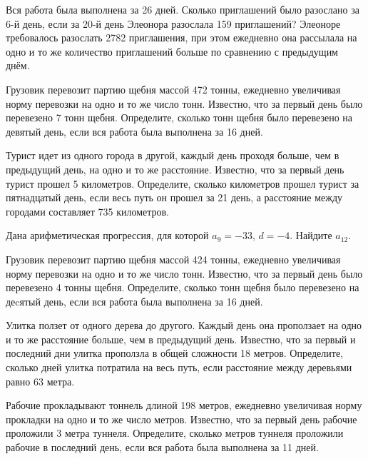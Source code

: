 \documentclass[4apaper]{article}
\begin{document}
\begin{taskBN}{39}
Вся работа была выполнена за 26 дней. Сколько приглашений было разослано за 6-й день, если за 20-й день Элеонора разослала 159 приглашений? Элеоноре требовалось разослать 2782 приглашения, при этом ежедневно она рассылала на одно и то же количество приглашений больше по сравнению с предыдущим днём. 
\end{taskBN}

\begin{taskBN}{40}
Грузовик перевозит партию щебня массой 472 тонны, ежедневно увеличивая норму перевозки на одно и то же число тонн. Известно, что за первый день было перевезено 7 тонн щебня. Определите, сколько тонн щебня было перевезено на девятый день, если вся работа была выполнена за 16 дней.
\end{taskBN}

\begin{taskBN}{41}
Турист идет из одного города в другой, каждый день проходя больше, чем в предыдущий день, на одно и то же расстояние. Известно, что за первый день турист прошел 5 километров. Определите, сколько километров прошел турист за пятнадцатый день, если весь путь он прошел за 21 день, а расстояние между городами составляет 735 километров.
\end{taskBN}

\begin{taskBN}{42}
Дана арифметическая прогрессия, для которой $a_{9} = -33$, $d=-4$. Найдите $a_{12}$.
\end{taskBN}

\begin{taskBN}{43}
Грузовик перевозит партию щебня массой 424 тонны, ежедневно увеличивая норму перевозки на одно и то же число тонн. Известно, что за первый день было перевезено 4 тонны щебня. Определите, сколько тонн щебня было перевезено на деcятый день, если вся работа была выполнена за 16 дней.
\end{taskBN}

\begin{taskBN}{44}
 Улитка ползет от одного дерева до другого. Каждый день она проползает на одно и то же расстояние больше, чем в предыдущий день. Известно, что за первый и последний дни улитка проползла в общей сложности 18 метров. Определите, сколько дней улитка потратила на весь путь, если расстояние между деревьями равно 63 метра.
\end{taskBN}

\begin{taskBN}{45}
 Рабочие прокладывают тоннель длиной 198 метров, ежедневно увеличивая норму прокладки на одно и то же число метров. Известно, что за первый день рабочие проложили 3 метра туннеля.  Определите, сколько метров туннеля проложили рабочие в последний день, если вся работа была выполнена за 11 дней.
\end{taskBN}
\end{document}
